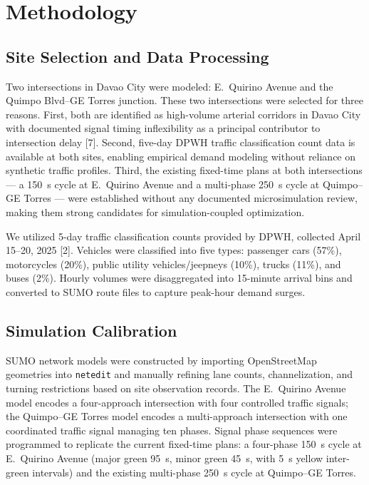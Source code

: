 \documentclass[a4paper,10pt]{article}
\begin{document}
	\section{Methodology}
	
	\subsection{Site Selection and Data Processing}
	Two intersections in Davao City were modeled: E.~Quirino Avenue and the Quimpo Blvd--GE Torres junction. These two intersections were selected for three reasons. First, both are identified as high-volume arterial corridors in Davao City with documented signal timing inflexibility as a principal contributor to intersection delay [7]. Second, five-day DPWH traffic classification count data is available at both sites, enabling empirical demand modeling without reliance on synthetic traffic profiles. Third, the existing fixed-time plans at both intersections --- a 150~s cycle at E.~Quirino Avenue and a multi-phase 250~s cycle at Quimpo--GE Torres --- were established without any documented microsimulation review, making them strong candidates for simulation-coupled optimization.

	We utilized 5-day traffic classification counts provided by DPWH, collected April 15--20, 2025 [2]. Vehicles were classified into five types: passenger cars (57\%), motorcycles (20\%), public utility vehicles/jeepneys (10\%), trucks (11\%), and buses (2\%). Hourly volumes were disaggregated into 15-minute arrival bins and converted to SUMO route files to capture peak-hour demand surges.
	
	\subsection{Simulation Calibration}
	SUMO network models were constructed by importing OpenStreetMap geometries into \texttt{netedit} and manually refining lane counts, channelization, and turning restrictions based on site observation records. The E.~Quirino Avenue model encodes a four-approach intersection with four controlled traffic signals; the Quimpo--GE Torres model encodes a multi-approach intersection with one coordinated traffic signal managing ten phases. Signal phase sequences were programmed to replicate the current fixed-time plans: a four-phase 150~s cycle at E.~Quirino Avenue (major green 95~s, minor green 45~s, with 5~s yellow inter-green intervals) and the existing multi-phase 250~s cycle at Quimpo--GE Torres.
\end{document}
